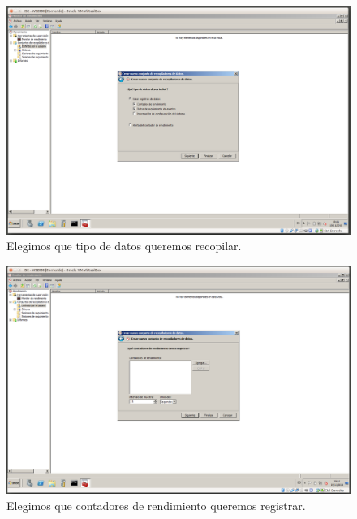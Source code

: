 \documentclass[a4paper,titlepage,12pt]{scrartcl}	%
\numberwithin{figure}{section} %
\numberwithin{table}{section} %
\begin{document}
	\begin{figure}[H]
		\centering
		\includegraphics[scale=0.27]{./Imagenes/5-3.png}
		\caption[Elegimos que tipo de datos queremos recopilar.]{Elegimos que tipo de datos queremos recopilar.}
		\label{5-3}
	\end{figure}
	
	\begin{figure}[H]
		\centering
		\includegraphics[scale=0.27]{./Imagenes/5-4.png}
		\caption[Elegimos que contadores de rendimiento queremos registrar.]{Elegimos que contadores de rendimiento queremos registrar.}
		\label{5-4}
	\end{figure}
	
\end{document}
